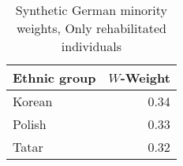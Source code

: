 \begin{table}[t]

\caption{\label{tab:sc_weights_rehabs}Synthetic German minority weights, Only rehabilitated individuals}
\centering
\begin{tabular}{lr}
\toprule
Ethnic group & $W$-Weight\\
\midrule
Korean & 0.34\\
Polish & 0.33\\
Tatar & 0.32\\
\bottomrule
\end{tabular}
\end{table}